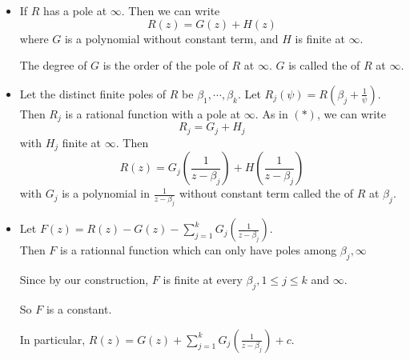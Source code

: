 \begin{itemize}
    \item If  $ R  $ has a pole at  $ \infty $. Then we can write
    \[R(z)=G(z)+H(z)\tag{$ \ast $}\]
    where  $ G  $ is a polynomial without constant term, and  $ H  $ is finite at  $ \infty  $.
    
    The degree of  $ G  $ is the order of the pole of  $ R  $ at  $ \infty  $.  $ G  $ is called the  of  $ R  $ at  $ \infty $.
    \item Let the distinct finite poles of  $ R  $ be  $ \beta_1,\cdots,\beta_k $. Let  $ R_j(\psi)=R(\beta_j+\frac{1 }{\psi}) $. Then  $ R_j  $ is a rational function with a pole at  $ \infty  $. As in  $ (\ast) $, we can write 
    \[R_j=G_j+H_j\]
    with  $ H_j  $ finite at  $ \infty $. Then 
    \[R(z)=G_j(\frac{1 }{z-\beta_j})+H(\frac{1 }{z-\beta_j})\]
    with  $ G_j  $ is a polynomial in  $ \frac{1 }{z-\beta_j} $ without constant term called the  of  $ R  $ at  $ \beta_j $.
    \item Let  $ F(z)=R(z)-G(z)-\sum\limits_{j=1}^kG_j(\frac{1 }{z-\beta_j}) $.\\
    Then  $ F  $ is a rationnal function which can only have poles among $ \beta_j,\infty $ 
    
    Since by our construction,  $  F  $ is finite at every  $ \beta_j,1 \leq j \leq k  $ and  $ \infty $.
    
    So  $ F  $ is a constant.
    
    In particular,  $ R(z)=G(z)+\sum\limits_{j=1}^kG_j(\frac{1 }{z-\beta_j})+c $.   
\end{itemize}
